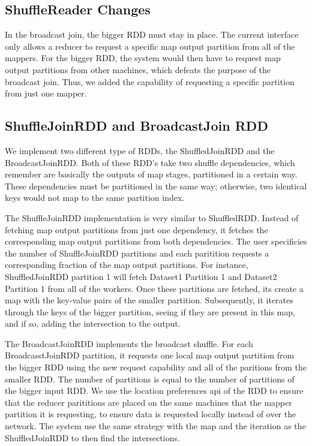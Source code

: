 \subsection{ShuffleReader Changes}

In the broadcast join, the bigger RDD must stay in place. The current interface only allows a reducer to request a specific map output partition
from all of the mappers. For the bigger RDD, the system would then have to request map output partitions from other machines, which defeats the purpose of the broadcast join. Thus, we added the capability of requesting a specific partition from just one mapper. 

\subsection{ShuffleJoinRDD and BroadcastJoin RDD}

We implement two different type of RDDs, the ShuffledJoinRDD and the
BroadcastJoinRDD. Both of these RDD's take two shuffle dependencies, which remember
are basically the outputs of map stages, partitioned in a certain way. These 
dependencies must be partitioned in the same way; otherwise, two identical keys would not map to the same partition index.  


The ShuffleJoinRDD implementation is very similar to ShuffledRDD. Instead of fetching map output partitions
from just one dependency, it fetches the corresponding map output partitions from both dependencies.   
The user specificies the number of ShuffleJoinRDD partitions and each paritition requests a corresponding fraction
of the map output partitions.
For instance, ShuffledJoinRDD partition 1 will fetch Dataset1 Partition 1 and Dataset2
Partition 1 from all of the workers. Once these partitions are fetched, its create a map with the key-value pairs of the smaller partition.
Subsequently, it iterates through the keys of the bigger partition, seeing if they are present in this map, and if so, adding the intersection to the output.

The BroadcastJoinRDD implements the broadcast shuffle.
For each BroadcasstJoinRDD partition, it requests one local map output partition from the bigger RDD using the new request capability and  
all of the paritions from the smaller RDD. The number of partitions is equal to the number of partitions of the bigger input RDD. We use the location
preferences api of the RDD to ensure that the reducer parititions are placed on the same machines that the mapper partition it is requesting, to ensure data is
requested locally instead of over the network. The system use the same strategy with the map and the iteration as the ShuffledJoinRDD to then find the intersections.

